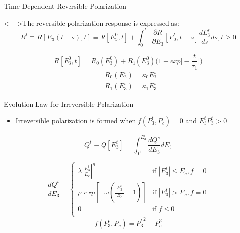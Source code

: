 \documentclass{beamer}
\begin{document}
\begin{frame}{Time Dependent Reversible Polarization}
\fontsize{9pt}{9pt}

\begin{block}<+->{The reversible polarization response is expressed as:}
\begin{equation}
\label{EQN:RevPol}
R^t\equiv R[E_3(t-s),t]= R[E_3^0,t]+\int_{0^+}^t\frac{\partial R}{\partial E_3} [E_3^t,t-s] \frac{dE_3^s}{ds}ds , t \geq 0
\end{equation}
\end{block} 

\begin{equation}
\label{EQN:StaticRevPol}
R[E_3^0,t]=R_0(E_3^0)+R_1(E_3^0)\big(1-exp\bigg[-\frac{t}{\tau_1}\bigg] \big)
\end{equation}
\begin{equation}
\label{EQN:R0R1Defini}
\begin{aligned}
&R_0(E_3^s)=\kappa_0 E_3^s \\
&R_1(E_3^s)=\kappa_1 E_3^s
\end{aligned}
\end{equation}
\end{frame}

\begin{frame}{Evolution Law for Irreversible Polarization}
  \begin{itemize}
  \item  Irreversible polarization is formed when $f(P_3^t,P_c)=0$ and $E_3^t P_3^t>0$
\end{itemize}
\fontsize{9pt}{9pt}
\begin{equation}
\label{EQN:IrrevePol}
Q^t\equiv Q[E_3^t]= \int_{0^+}^{E_3^t}\frac{d Q^s}{d E_3}{dE_3}
\end{equation}

\begin{equation}
\frac{d Q^t}{d E_3}=
  \begin{cases}
   \lambda|\frac{E_3^t}{E_c}|^n& \text{if } |E_3^t|\leq E_c, f=0 \\
\mu . exp[-\omega(\frac{|E_3^t|}{E_c}-1)] & \text{if }|E_3^t|> E_c, f=0 \\ 0
& \text{if } f\leqslant 0 \\
  \end{cases}
\label{EQN:TimeDepIrrevePol}  
\end{equation}
\begin{equation}
\label{EQN:SurfacePol}
f(P_3^t,P_c)={P_3^t}^2-P_c^2
\end{equation}
\end{frame}
\end{document}
